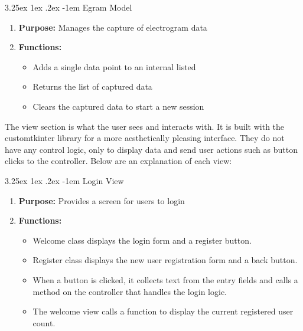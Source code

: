 \documentclass{article}
\makeatletter
\newcounter{subsubsubsection}[subsubsection]
\renewcommand\paragraph{\@startsection{paragraph}{5}{\z@}%
  {3.25ex \@plus1ex \@minus.2ex}%
  {-1em}%
  {\normalfont\normalsize\bfseries}}
\makeatother
\begin{document}
\paragraph{Egram Model}
\begin{enumerate}[label=]
    \item \textbf{Purpose:} Manages the capture of electrogram data 
    \item \textbf{Functions:}
    \begin{itemize}
        \item Adds a single data point to an internal listed
        \item Returns the list of captured data 
        \item Clears the captured data to start a new session 
    \end{itemize}
\end{enumerate}

The view section is what the user sees and interacts with. It is built with the customtkinter 
library for a more aesthetically pleasing interface. They do not have any control logic, only 
to display data and send user actions such as button clicks to the controller. Below 
are an explanation of each view:

\paragraph{Login View}
\begin{enumerate}[label=]
    \item \textbf{Purpose:} Provides a screen for users to login 
    \item \textbf{Functions:} 
    \begin{itemize}
        \item Welcome class displays the login form and a register button.
        \item Register class displays the new user registration form and a back button.
        \item When a button is clicked, it collects text from the entry fields and calls 
        a method on the controller that handles the login logic. 
        \item The welcome view calls a function to display the current registered user count.
    \end{itemize}
\end{enumerate}
\end{document}
